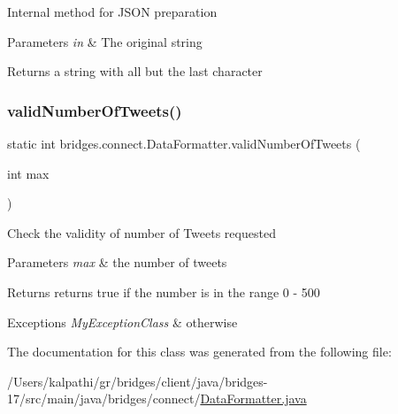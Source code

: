 Internal method for J\+S\+ON preparation 
\begin{DoxyParams}{Parameters}
{\em in} & The original string \\
\hline
\end{DoxyParams}
\begin{DoxyReturn}{Returns}
a string with all but the last character 
\end{DoxyReturn}
\mbox{\label{classbridges_1_1connect_1_1_data_formatter_ad17084ac8b0f28837ebb1d77905cefb8}} 
\subsubsection{\texorpdfstring{valid\+Number\+Of\+Tweets()}{validNumberOfTweets()}}
{\footnotesize\ttfamily static int bridges.\+connect.\+Data\+Formatter.\+valid\+Number\+Of\+Tweets (\begin{DoxyParamCaption}\item[{int}]{max }\end{DoxyParamCaption})\hspace{0.3cm}{\ttfamily [static]}}

Check the validity of number of Tweets requested 
\begin{DoxyParams}{Parameters}
{\em max} & the number of tweets \\
\hline
\end{DoxyParams}
\begin{DoxyReturn}{Returns}
returns true if the number is in the range 0 -\/ 500 
\end{DoxyReturn}

\begin{DoxyExceptions}{Exceptions}
{\em My\+Exception\+Class} & otherwise \\
\hline
\end{DoxyExceptions}


The documentation for this class was generated from the following file\+:\begin{DoxyCompactItemize}
\item 
/\+Users/kalpathi/gr/bridges/client/java/bridges-\/17/src/main/java/bridges/connect/\mbox{\hyperlink{_data_formatter_8java}{Data\+Formatter.\+java}}\end{DoxyCompactItemize}
